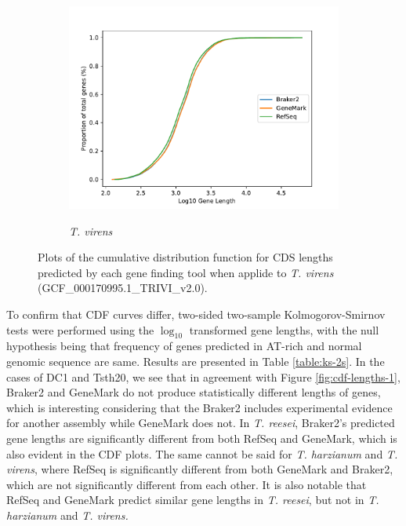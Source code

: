 \begin{figure}
  \centering
  \begin{subfigure}{0.7\textwidth}
    \includegraphics[width=\textwidth]{figures/t-virens-cdf-lengths-log.pdf}
    \label{fig:tvirens-lengths}
    \caption{\textit{T. virens}}
  \end{subfigure}
  \caption[CDF plots part 3.]{Plots of the cumulative distribution
    function for CDS lengths predicted by each gene finding tool when
    applide to \textit{T. virens} (GCF\_000170995.1\_TRIVI\_v2.0).}
  \label{fig:cdf-lengths-3}
\end{figure}

To confirm that CDF curves differ, two-sided two-sample
Kolmogorov-Smirnov\cite{ref1} tests were performed using the
$\log_{10}$ transformed gene lengths, with the null hypothesis being
that frequency of genes predicted in AT-rich and normal genomic
sequence are same. Results are presented in Table
\ref{table:ks-2s}. In the cases of DC1 and Tsth20, we see that in
agreement with Figure \ref{fig:cdf-lengths-1}, Braker2 and GeneMark do
not produce statistically different lengths of genes, which is
interesting considering that the Braker2 includes experimental
evidence for another assembly while GeneMark does not. In
\textit{T. reesei}, Braker2's predicted gene lengths are significantly
different from both RefSeq and GeneMark, which is also evident in the
CDF plots. The same cannot be said for \textit{T. harzianum} and
\textit{T. virens}, where RefSeq is significantly different from both
GeneMark and Braker2, which are not significantly different from each
other. It is also notable that RefSeq and GeneMark predict similar
gene lengths in \textit{T. reesei}, but not in \textit{T. harzianum}
and \textit{T. virens.}

